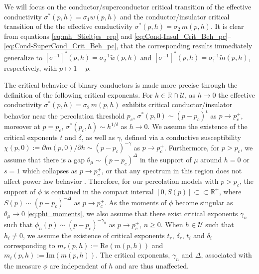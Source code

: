 \documentclass[english,12pt]{ttuthes}
\begin{document}
We will focus on the conductor/superconductor critical transition of
the effective conductivity $\sigma^*(p,h)=\sigma_1w(p,h)$ and the
conductor/insulator critical transition of the the effective
conductivity $\sigma^*(p,h)=\sigma_2\,m(p,h)$. It is clear from equations
\eqref{eq:mh_Stieltjes_rep} and 
\eqref{eq:Cond-Insul_Crit_Beh_pc}--\eqref{eq:Cond-SuperCond_Crit_Beh_pc},
that the corresponding results immediately generalize to
$[\sigma^{-1}]^*(p,h)=\sigma_2^{-1}\tilde{w}(p,h)$ and
$[\sigma^{-1}]^*(p,h)=\sigma_1^{-1}\tilde{m}(p,h)$, respectively, with $p\mapsto1-p$. 

The critical behavior of binary conductors is made more precise
through the definition of the following critical exponents. For
$h\in\mathbb{R}\cap\mathcal{U}$, as $h\to0$ the effective conductivity
$\sigma^*(p,h)=\sigma_2\,m(p,h)$ exhibits critical conductor/insulator behavior
near the percolation threshold $p_c$, $\sigma^*(p,0)\sim(p-p_c)^t$ as
$p\to p_c^+$, moreover at $p=p_c$,
$\sigma^*(p_c,h)\sim h^{1/\delta}$ as $h\to0$. We assume the existence of the
critical exponents $t$ and $\delta$, as well as $\gamma$, defined via a
conductive susceptibility $\chi(p,0):=\partial m(p,0)/\partial h\sim(p-p_c)^{-\gamma}$ as
$p\to p_c^+$. Furthermore, for $p>p_c$, we assume that there is a gap 
$\theta_\mu\sim(p-p_c)^\Delta$ in the support of $\mu$ around $h=0$ or $s=1$ which
collapses as $p\to p_c^+$, or that any spectrum in this region does not
affect power law behavior \cite{Golden:PRL-3935}. Therefore, for our
percolation models with $p>p_c$, the support of $\phi$ is contained in
the compact interval $[0,S(p)]\subset\subset\mathbb{R}^+$, where $S(p)\sim(p-p_c)^{-\Delta}$ as
$p\to p_c^+$. As the moments of $\phi$ become singular as $\theta_\mu\to0$ 
\eqref{eq:phi_moments}, we also assume that there exist critical
exponents $\gamma_n$ such that $\phi_n(p)\sim(p-p_c)^{-\gamma_n}$ as $p\to p_c^+$,
$n\geq0$. When $h\in\mathcal{U}$ such that $h_i\neq0$, we
assume the existence of critical exponents $t_r$, $\delta_r$, $t_i$ and
$\delta_i$ corresponding to $m_r(p,h):=\text{Re}(m(p,h))$ and
$m_i(p,h):=\text{Im}(m(p,h))$. The critical exponents, $\gamma_n$ and $\Delta$,
associated with the measure $\phi$ are independent of $h$ and are thus
unaffected. 
\end{document}
